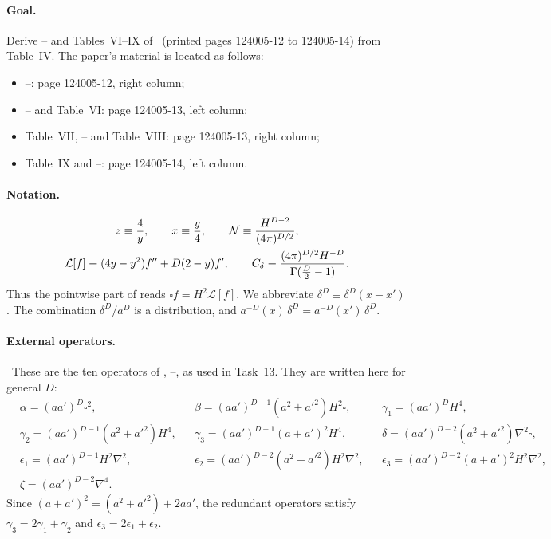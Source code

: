 \paragraph{Goal.} Derive -- and Tables~VI--IX of \PI\ (printed pages 124005-12 to 124005-14) from Table~IV.
The paper's material is located as follows:
\begin{itemize}[itemsep=0pt]
\item {}--: page 124005-12, right column;
\item {}-- and Table~VI: page 124005-13, left column;
\item Table~VII, -- and Table~VIII: page 124005-13, right column;
\item Table~IX and --: page 124005-14, left column.
\end{itemize}

\paragraph{Notation.}
\begin{gather*}
z\equiv\frac4y,\qquad x\equiv\frac y4,\qquad \mathcal N\equiv\frac{H^{D-2}}{(4\pi)^{D/2}},\\
\mathcal L[f]\equiv(4y-y^2)f''+D(2-y)f',\qquad C_{\delta}\equiv\frac{(4\pi)^{D/2}H^{-D}}{\Gamma(\frac D2-1)} .
\end{gather*}
Thus the pointwise part of  reads $\square f=H^2\mathcal L[f]$. We abbreviate $\delta^D\equiv\delta^D(x-x')$.
The combination $\delta^D/a^D$ is a distribution, and $a^{-D}(x)\,\delta^D=a^{-D}(x')\,\delta^D$.

\paragraph{External operators.} \tP\ These are the ten operators of \PI, --, as used in Task~13. They are written here for general $D$:
\begin{equation*}
\begin{aligned}
&\alpha=(aa')^D\square^2, && \beta=(aa')^{D-1}(a^2+a'^2)H^2\square, && \gamma_1=(aa')^DH^4,\\
&\gamma_2=(aa')^{D-1}(a^2+a'^2)H^4, && \gamma_3=(aa')^{D-1}(a+a')^2H^4, && \delta=(aa')^{D-2}(a^2+a'^2)\nabla^2\square,\\
&\epsilon_1=(aa')^{D-1}H^2\nabla^2, && \epsilon_2=(aa')^{D-2}(a^2+a'^2)H^2\nabla^2, && \epsilon_3=(aa')^{D-2}(a+a')^2H^2\nabla^2,\\
&\zeta=(aa')^{D-2}\nabla^4 .
\end{aligned}
\end{equation*}
Since $(a+a')^2=(a^2+a'^2)+2aa'$, the redundant operators satisfy $\gamma_3=2\gamma_1+\gamma_2$ and $\epsilon_3=2\epsilon_1+\epsilon_2$.

